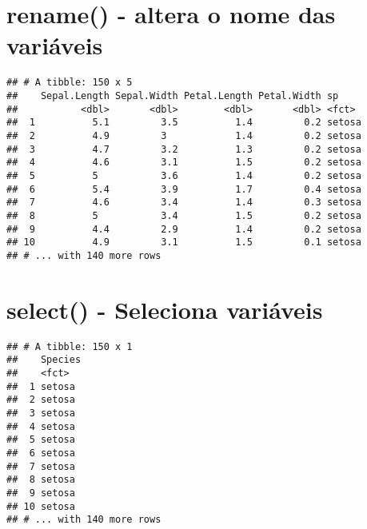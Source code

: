 \documentclass[]{book}
\newenvironment{Shaded}{\begin{snugshade}}{\end{snugshade}}
\newcommand{\DataTypeTok}[1]{\textcolor[rgb]{0.13,0.29,0.53}{#1}}
\newcommand{\KeywordTok}[1]{\textcolor[rgb]{0.13,0.29,0.53}{\textbf{#1}}}
\newcommand{\NormalTok}[1]{#1}
\newcommand{\OperatorTok}[1]{\textcolor[rgb]{0.81,0.36,0.00}{\textbf{#1}}}
\newcommand{\StringTok}[1]{\textcolor[rgb]{0.31,0.60,0.02}{#1}}
\begin{document}
\hypertarget{rename---altera-o-nome-das-variuxe1veis}{%
\section{rename() - altera o nome das variáveis}\label{rename---altera-o-nome-das-variuxe1veis}}

\begin{Shaded}
\end{Shaded}

\begin{verbatim}
## # A tibble: 150 x 5
##    Sepal.Length Sepal.Width Petal.Length Petal.Width sp    
##           <dbl>       <dbl>        <dbl>       <dbl> <fct> 
##  1          5.1         3.5          1.4         0.2 setosa
##  2          4.9         3            1.4         0.2 setosa
##  3          4.7         3.2          1.3         0.2 setosa
##  4          4.6         3.1          1.5         0.2 setosa
##  5          5           3.6          1.4         0.2 setosa
##  6          5.4         3.9          1.7         0.4 setosa
##  7          4.6         3.4          1.4         0.3 setosa
##  8          5           3.4          1.5         0.2 setosa
##  9          4.4         2.9          1.4         0.2 setosa
## 10          4.9         3.1          1.5         0.1 setosa
## # ... with 140 more rows
\end{verbatim}

\hypertarget{select---seleciona-variuxe1veis}{%
\section{select() - Seleciona variáveis}\label{select---seleciona-variuxe1veis}}

\begin{Shaded}
\end{Shaded}

\begin{verbatim}
## # A tibble: 150 x 1
##    Species
##    <fct>  
##  1 setosa 
##  2 setosa 
##  3 setosa 
##  4 setosa 
##  5 setosa 
##  6 setosa 
##  7 setosa 
##  8 setosa 
##  9 setosa 
## 10 setosa 
## # ... with 140 more rows
\end{verbatim}
\end{document}
